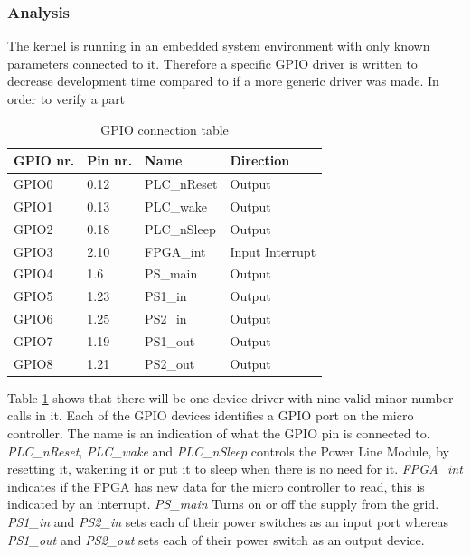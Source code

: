 \subsubsection{Analysis}
The kernel is running in an embedded system environment with only known parameters connected to it. Therefore a specific GPIO driver is written to decrease development time compared to if a more generic driver was made.
\p 
In order to verify a part
\begin{table}[H]
	\centering
	\begin{tabular}{|p{2cm}|p{2cm}|p{3cm}|p{3cm}|}\hline
		GPIO nr.		& Pin nr.		& Name			& Direction		\\\hline
		GPIO0		& 0.12		& PLC\_nReset		& Output			\\\hline
		GPIO1		& 0.13		& PLC\_wake		& Output			\\\hline
		GPIO2		& 0.18		& PLC\_nSleep		& Output			\\\hline
		GPIO3		& 2.10		& FPGA\_int		& Input Interrupt	\\\hline
		GPIO4		& 1.6			& PS\_main		& Output			\\\hline
		GPIO5		& 1.23		& PS1\_in			& Output			\\\hline
		GPIO6		& 1.25		& PS2\_in			& Output			\\\hline
		GPIO7		& 1.19		& PS1\_out		& Output			\\\hline
		GPIO8		& 1.21		& PS2\_out		& Output			\\\hline
	\end{tabular}
	\caption{GPIO connection table}
	\label{tab:gpio_table}
\end{table}
Table \ref{tab:gpio_table} shows that there will be one device driver with nine valid minor number calls in it. Each of the GPIO devices identifies a GPIO port on the micro controller. The name is an indication of what the GPIO pin is connected to. 
\p \textit{PLC\_nReset}, \textit{PLC\_wake} and \textit{PLC\_nSleep} controls the Power Line Module, by resetting it, wakening it or put it to sleep when there is no need for it.
\p \textit{FPGA\_int} indicates if the FPGA has new data for the micro controller to read, this is indicated by an interrupt.
\p \textit{PS\_main} Turns on or off the supply from the grid.
\p \textit{PS1\_in} and \textit{PS2\_in} sets each of their power switches as an input port whereas \textit{PS1\_out} and \textit{PS2\_out} sets each of their power switch as an output device.        
%
%
